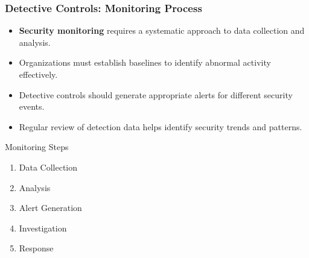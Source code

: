 \documentclass{beamer}
\begin{document}
\begin{frame}
    \frametitle{Detective Controls: Monitoring Process}
    
    \begin{itemize}
        \item \textbf{Security monitoring} requires a systematic approach to data collection and analysis.
        
        \item Organizations must establish baselines to identify abnormal activity effectively.
        
        \item Detective controls should generate appropriate alerts for different security events.
        
        \item Regular review of detection data helps identify security trends and patterns.
    \end{itemize}
    
    \begin{block}{Monitoring Steps}
        \begin{enumerate}
            \item Data Collection
            \item Analysis
            \item Alert Generation
            \item Investigation
            \item Response
        \end{enumerate}
    \end{block}
\end{frame}
\end{document}
